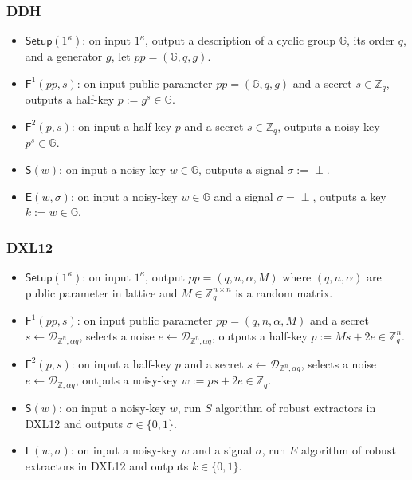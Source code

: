 \subsubsection{DDH}
\begin{itemize}
\item $\mathsf{Setup}(1^\kappa)$: on input $1^\kappa$, output a description of a cyclic group $\mathbb{G}$, its order $q$, and a generator $g$, let $pp=(\mathbb{G},q,g)$.

\item $\mathsf{F}^1(pp,s)$: on input public parameter $pp=(\mathbb{G},q,g)$ and a secret $s\in \mathbb{Z}_q$, outputs a half-key $p:= g^s \in \mathbb{G}$.

\item $\mathsf{F}^2(p, s)$: on input a half-key $p$ and a secret $s \in \mathbb{Z}_q$, outputs a noisy-key $p^s \in \mathbb{G}$.

\item $\mathsf{S}(w)$: on input a noisy-key $w\in \mathbb{G}$, outputs a signal $\sigma :=\perp$. 

\item $\mathsf{E}(w,\sigma)$: on input a noisy-key $w\in \mathbb{G}$ and a signal $\sigma=\perp$, outputs a key $k:=w \in \mathbb{G}$. 
\end{itemize}


\subsubsection{DXL12}
\begin{itemize}
\item $\mathsf{Setup}(1^\kappa)$: on input $1^\kappa$, output $pp=(q,n,\alpha, M)$ where $(q,n,\alpha)$ are public parameter in lattice and $M\in \mathbb{Z}_q^{n\times n}$ is a random matrix. 

\item $\mathsf{F}^1(pp,s)$: on input public parameter $pp=(q,n,\alpha,M)$ and a secret $s\leftarrow \mathcal{D}_{\mathbb{Z}^n,\alpha q} $, selects a noise $e\leftarrow \mathcal{D}_{\mathbb{Z}^n,\alpha q}$, outputs a half-key $p:= Ms +2e \in \mathbb{Z}_q^n$.

\item $\mathsf{F}^2(p, s)$: on input a half-key $p$ and a secret $s\leftarrow \mathcal{D}_{\mathbb{Z}^n,\alpha q} $, selects a noise $e\leftarrow \mathcal{D}_{\mathbb{Z},\alpha q}$, outputs a noisy-key $w:= ps+2e \in \mathbb{Z}_q$.

\item $\mathsf{S}(w)$: on input a noisy-key $w$, run $S$ algorithm of robust extractors in DXL12 and outputs $\sigma \in \{0,1\}$. 

\item $\mathsf{E}(w,\sigma)$: on input a noisy-key $w$ and a signal $\sigma$, run $E$ algorithm of robust extractors in DXL12 and outputs $k \in \{0,1\}$. 
\end{itemize}
	


